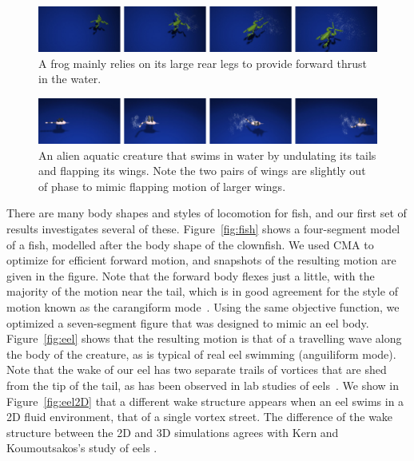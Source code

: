 \begin{figure}[ht]
\centering
\includegraphics[width=\textwidth]{figures/frog.eps}
\caption{A frog mainly relies on its large rear legs to provide forward thrust in the water.}
\label{fig:frog}
\end{figure}


\begin{figure}[ht]
\centering
\includegraphics[width=\textwidth]{figures/alien.eps}
\caption{An alien aquatic creature that swims in water by undulating its tails and flapping its wings. Note the two pairs of wings are slightly out of phase to mimic flapping motion of larger wings.}
\label{fig:alien}
\end{figure}



There are many body shapes and styles of locomotion for fish, and our
first set of results investigates several of these.  Figure~\ref{fig:fish}
shows a four-segment model of a fish, modelled after the body shape of the
clownfish.  We used CMA to optimize for efficient forward motion, and snapshots of the resulting motion are given in the figure.  Note that the
forward body flexes just a little, with the majority of the motion near
the tail, which is in good agreement for the style of motion known as the
carangiform mode~\cite{lindsey1978form}.  Using the same objective
function, we optimized a seven-segment figure that was designed to mimic
an eel body.  Figure~\ref{fig:eel} shows that the resulting motion is that
of a travelling wave along the body of the creature, as is typical of real
eel swimming (anguiliform mode).  Note that the wake of our eel has two
separate trails of vortices that are shed from the tip of the tail, as has
been observed in lab studies of eels~\cite{tytell2004hydrodynamics}. We show in Figure~\ref{fig:eel2D} that a different wake structure appears when an eel swims in a 2D fluid environment, that of a single vortex street. The difference of the wake structure between the 2D and 3D simulations agrees with Kern and Koumoutsakos's study of eels \cite{kern2006simulations}.


